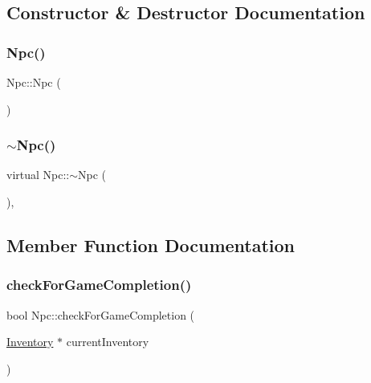 \subsection{Constructor \& Destructor Documentation}
\mbox{\label{class_npc_a748bee1d096f0dc38a80f2db64186644}} 
\subsubsection{\texorpdfstring{Npc()}{Npc()}}
{\footnotesize\ttfamily Npc\+::\+Npc (\begin{DoxyParamCaption}{ }\end{DoxyParamCaption})\hspace{0.3cm}{\ttfamily [inline]}}

\mbox{\label{class_npc_aed228b9aadbc7e1fddfc10395713a932}} 
\subsubsection{\texorpdfstring{$\sim$\+Npc()}{~Npc()}}
{\footnotesize\ttfamily virtual Npc\+::$\sim$\+Npc (\begin{DoxyParamCaption}{ }\end{DoxyParamCaption})\hspace{0.3cm}{\ttfamily [inline]}, {\ttfamily [virtual]}}



\subsection{Member Function Documentation}
\mbox{\label{class_npc_aa1f04e3560c27e1770696fd3e7eb0c95}} 
\subsubsection{\texorpdfstring{check\+For\+Game\+Completion()}{checkForGameCompletion()}}
{\footnotesize\ttfamily bool Npc\+::check\+For\+Game\+Completion (\begin{DoxyParamCaption}\item[{\mbox{\hyperlink{class_inventory}{Inventory}} $\ast$}]{current\+Inventory }\end{DoxyParamCaption})\hspace{0.3cm}{\ttfamily [virtual]}}




